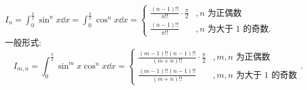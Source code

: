 \begin{inference}\label{inference:Wallis}
    $\displaystyle I_n=\int_{0}^{\frac{\pi}{2}}\sin^nx\dd x=\int_{0}^{\frac{\pi}{2}}\cos ^nx\dd x=\begin{cases}
            \displaystyle \frac{(n-1)!!}{n!!}\cdot \frac{\pi}{2} & ,n\text{ 为正偶数}         \\[6pt]
            \displaystyle \frac{(n-1)!!}{n!!}                    & ,n\text{ 为大于 1 的奇数.}
        \end{cases}$\\
    一般形式: $$I_{m,n}=\int_{0}^{\frac{\pi}{2}}\sin^mx\cos^nx\dd x=\begin{cases}
            \displaystyle \frac{(m-1)!!(n-1)!!}{(m+n)!!}\cdot \frac{\pi}{2} & ,m,n\text{ 为正偶数}        \\[6pt]
            \displaystyle \frac{(m-1)!!(n-1)!!}{(m+n)!!}                    & ,m,n\text{ 为大于 1 的奇数}
        \end{cases}.
        \label{Wallis gs}$$
\end{inference}
